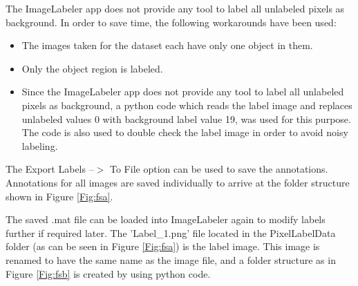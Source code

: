 The ImageLabeler app does not provide any tool to label all unlabeled pixels as background. In order to save time, the following workarounds have been used:
	\begin{itemize}
		\item The images taken for the dataset each have only one object in them.
		\item Only the object region is labeled.
		\item Since the ImageLabeler app does not provide any tool to label all unlabeled pixels as background, a python code which reads the label image and replaces unlabeled values 0 with background label value 19, was used for this purpose. The code is also used to double check the label image in order to avoid noisy labeling.
	\end{itemize}
	
The Export Labels --$>$ To File option can be used to save the annotations. Annotations for all images are saved individually to arrive at the folder structure shown in Figure \ref{Fig:fsa}.
	
The saved .mat file can be loaded into ImageLabeler again to modify labels further if required later. The 'Label\_1.png' file located in the PixelLabelData folder (as can be seen in Figure  \ref{Fig:fsa}) is the label image. This image is renamed to have the same name as the image file, and a folder structure as in Figure \ref{Fig:fsb} is created by using python code.
	
